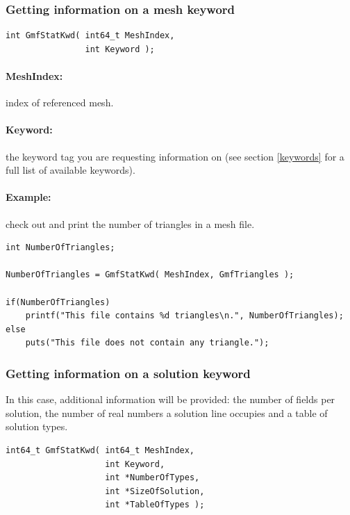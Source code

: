 \documentclass[a4paper,12pt]{article}
\begin{document}
\subsubsection{Getting information on a mesh keyword}

\begin{tt}
\begin{verbatim}
int GmfStatKwd( int64_t MeshIndex,
                int Keyword );
\end{verbatim}
\end{tt}
\normalfont

\paragraph{MeshIndex:} index of referenced mesh.

\paragraph{Keyword:} the keyword tag you are requesting information on (see section \ref{keywords} for a full list of available keywords).

\paragraph{Example:} check out and print the number of triangles in a mesh file.

\begin{tt}
\begin{verbatim}
int NumberOfTriangles;

NumberOfTriangles = GmfStatKwd( MeshIndex, GmfTriangles );

if(NumberOfTriangles)
    printf("This file contains %d triangles\n.", NumberOfTriangles);
else
    puts("This file does not contain any triangle.");
\end{verbatim}
\end{tt}
\normalfont

\subsubsection{Getting information on a solution keyword}
In this case, additional information will be provided: the number of fields per solution, the number of real numbers a solution line occupies and a table of solution types.

\begin{tt}
\begin{verbatim}
int64_t GmfStatKwd( int64_t MeshIndex,
                    int Keyword,
                    int *NumberOfTypes,
                    int *SizeOfSolution,
                    int *TableOfTypes );
\end{verbatim}
\end{tt}
\normalfont
\end{document}
